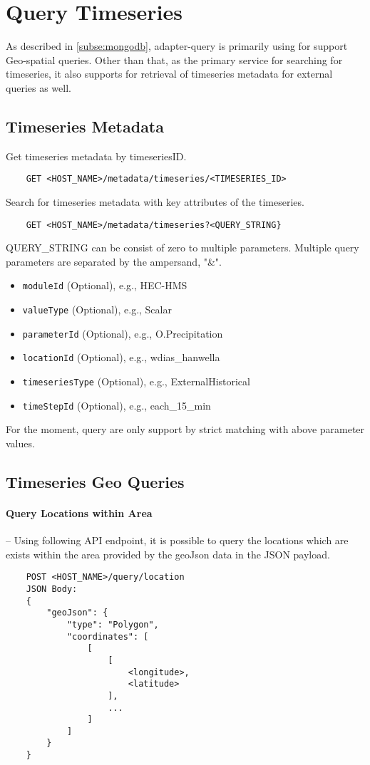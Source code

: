 \section{Query Timeseries}
\label{se:query}

As described in \cref{subse:mongodb}, adapter-query is primarily using for support Geo-spatial queries. Other than that, as the primary service for searching for timeseries, it also supports for retrieval of timeseries metadata for external queries as well.

\subsection{Timeseries Metadata}
Get timeseries metadata by timeseriesID.
\begin{lstlisting}
    GET <HOST_NAME>/metadata/timeseries/<TIMESERIES_ID>
\end{lstlisting}

Search for timeseries metadata with key attributes of the timeseries.
\begin{lstlisting}
    GET <HOST_NAME>/metadata/timeseries?<QUERY_STRING}
\end{lstlisting}

QUERY\_STRING can be consist of zero to multiple parameters. Multiple query parameters are separated by the ampersand, "\&".
\begin{itemize}
    \item \texttt{moduleId} (Optional), e.g., HEC-HMS
    \item \texttt{valueType} (Optional), e.g., Scalar
    \item \texttt{parameterId} (Optional), e.g., O.Precipitation
    \item \texttt{locationId} (Optional), e.g., wdias\_hanwella
    \item \texttt{timeseriesType} (Optional), e.g., ExternalHistorical
    \item \texttt{timeStepId} (Optional), e.g., each\_15\_min
\end{itemize}
For the moment, query are only support by strict matching with above parameter values.

\subsection{Timeseries Geo Queries}

\paragraph{Query Locations within Area}-- Using following API endpoint, it is possible to query the locations which are exists within the area provided by the geoJson data in the JSON payload.
\begin{lstlisting}
    POST <HOST_NAME>/query/location
    JSON Body:
    {
        "geoJson": {
            "type": "Polygon",
            "coordinates": [
                [
                    [
                        <longitude>,
                        <latitude>
                    ],
                    ...
                ]
            ]
        }
    }
\end{lstlisting}

